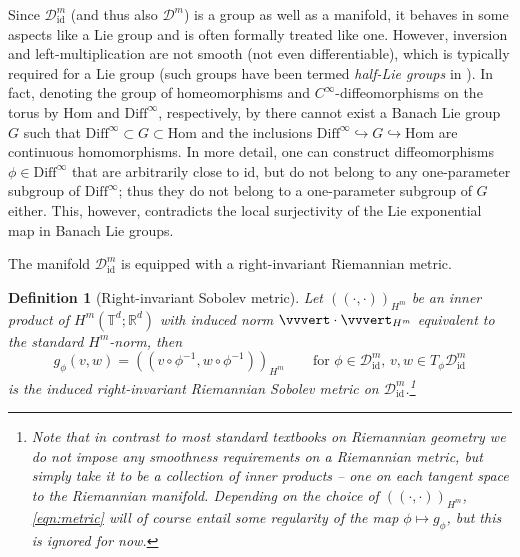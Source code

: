 \documentclass[a4paper, 12pt]{article}
\newtheorem{definition}[theorem]{Definition}
\newcommand{\R}{\mathbb{R}}
\newcommand{\T}{\mathbb{T}}
\newcommand{\id}{\mathrm{id}}
\newcommand{\DiffSob}{\mathcal D}
\newcommand{\DiffSobId}{\mathcal D_{\id}}
\newcommand{\Diff}{\mathrm{Diff}}
\newcommand{\Hom}{\mathrm{Hom}}
\newcommand{\IPHm}[2]{(\!(#1,#2)\!)_{H^m}} %
\newcommand{\NHm}[1]{\vvvert#1\vvvert_{H^m}} %
\begin{document}
Since $\DiffSobId^m$ (and thus also $\DiffSob^m$) is a group as well as a manifold, it behaves in some aspects like a Lie group and is often formally treated like one.
However, inversion and left-multiplication are not smooth (not even differentiable), which is typically required for a Lie group
(such groups have been termed \emph{half-Lie groups} in \cite{KrMiRa15,MaNe18}).
In fact, denoting the group of homeomorphisms and $C^\infty$-diffeomorphisms on the torus by $\Hom$ and $\Diff^\infty$, respectively,
by \cite[III, Exerc.\,\S4, \P7]{Bo72} there cannot exist a Banach Lie group $G$
such that $\Diff^\infty\subset G\subset\Hom$ and the inclusions $\Diff^\infty\hookrightarrow G\hookrightarrow\Hom$ are continuous homomorphisms.
In more detail, one can construct diffeomorphisms $\phi\in\Diff^\infty$ that are arbitrarily close to $\id$, but do not belong to any one-parameter subgroup of $\Diff^\infty$;
thus they do not belong to a one-parameter subgroup of $G$ either.
This, however, contradicts the local surjectivity of the Lie exponential map in Banach Lie groups.

The manifold $\DiffSobId^m$ is equipped with a right-invariant Riemannian metric.

\begin{definition}[Right-invariant Sobolev metric]\label{def:SobolevMetric}
Let $\IPHm{\cdot}{\cdot}$ be an inner product of $H^m(\T^d;\R^d)$ with induced norm $\NHm{\cdot}$ equivalent to the standard $H^m$-norm, then
\begin{equation}\label{eqn:metric}
g_\phi(v,w)=\IPHm{v\circ\phi^{-1}}{w\circ\phi^{-1}}
\qquad\text{for }
\phi\in\DiffSobId^m,\,v,w\in T_\phi\DiffSobId^m
\end{equation}
is the induced \emph{right-invariant Riemannian Sobolev metric} on $\DiffSobId^m$.\footnote{%
Note that in contrast to most standard textbooks on Riemannian geometry
we do not impose any smoothness requirements on a Riemannian metric, but simply take it to be a collection of inner products -- one on each tangent space to the Riemannian manifold.
Depending on the choice of $\IPHm\cdot\cdot$, \eqref{eqn:metric} will of course entail \emph{some} regularity of the map $\phi\mapsto g_\phi$, but this is ignored for now.%
}%
\end{definition}
\end{document}
